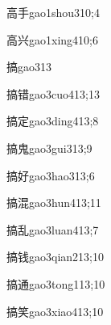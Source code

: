 \begin{verbete}{高手}{gao1shou3}{10;4}
\end{verbete}

\begin{verbete}{高兴}{gao1xing4}{10;6}
\end{verbete}

\begin{verbete}{搞}{gao3}{13}
\end{verbete}

\begin{verbete}{搞错}{gao3cuo4}{13;13}
\end{verbete}

\begin{verbete}{搞定}{gao3ding4}{13;8}
\end{verbete}

\begin{verbete}{搞鬼}{gao3gui3}{13;9}
\end{verbete}

\begin{verbete}{搞好}{gao3hao3}{13;6}
\end{verbete}

\begin{verbete}{搞混}{gao3hun4}{13;11}
\end{verbete}

\begin{verbete}{搞乱}{gao3luan4}{13;7}
\end{verbete}

\begin{verbete}{搞钱}{gao3qian2}{13;10}
\end{verbete}

\begin{verbete}{搞通}{gao3tong1}{13;10}
\end{verbete}

\begin{verbete}{搞笑}{gao3xiao4}{13;10}
\end{verbete}

